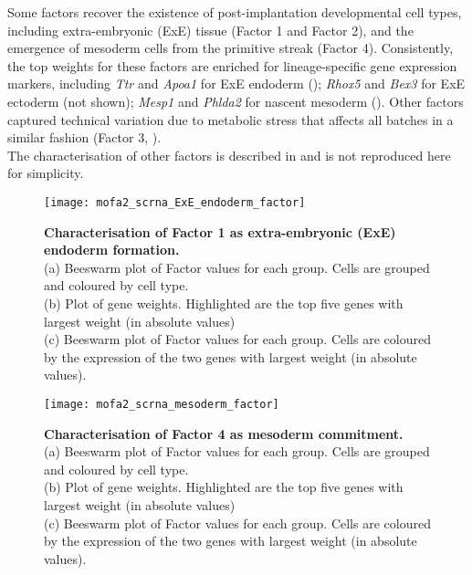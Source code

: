 Some factors recover the existence of post-implantation developmental cell types, including extra-embryonic (ExE) tissue (Factor 1 and Factor 2), and the emergence of mesoderm cells from the primitive streak (Factor 4). Consistently, the top weights for these factors are enriched for lineage-specific gene expression markers, including \textit{Ttr} and \textit{Apoa1} for ExE endoderm (); \textit{Rhox5} and \textit{Bex3} for ExE ectoderm (not shown); \textit{Mesp1} and \textit{Phlda2} for nascent mesoderm (). Other factors captured technical variation due to metabolic stress that affects all batches in a similar fashion (Factor 3, ).\\
The characterisation of other factors is described in\cite{Argelaguet2020} and is not reproduced here for simplicity.

\begin{figure}[H]
	\centering
	\texttt{[image: mofa2\_scrna\_ExE\_endoderm\_factor]}
	\caption[]{
	\textbf{Characterisation of Factor 1 as extra-embryonic (ExE) endoderm formation.} \\
	(a) Beeswarm plot of Factor values for each group. Cells are grouped and coloured by cell type. \\
	(b) Plot of gene weights. Highlighted are the top five genes with largest weight (in absolute values) \\
	(c) Beeswarm plot of Factor values for each group. Cells are coloured by the expression of the two genes with largest weight (in absolute values).
	}
	\label{fig:mofa2_scrna_ExE_endoderm_factor}
\end{figure}

\begin{figure}[H]
	\centering
	\texttt{[image: mofa2\_scrna\_mesoderm\_factor]}
	\caption[]{\textbf{Characterisation of Factor 4 as mesoderm commitment.} \\
	(a) Beeswarm plot of Factor values for each group. Cells are grouped and coloured by cell type. \\
	(b) Plot of gene weights. Highlighted are the top five genes with largest weight (in absolute values) \\
	(c) Beeswarm plot of Factor values for each group. Cells are coloured by the expression of the two genes with largest weight (in absolute values).
	}
	\label{fig:mofa2_scrna_mesoderm_factor}
\end{figure} 

